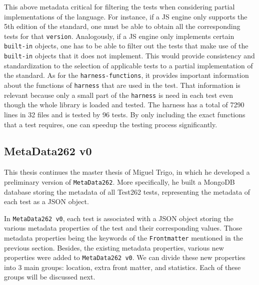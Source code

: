\documentclass[runningheads]{llncs}
\begin{document}
This above metadata critical for filtering the tests when considering partial implementations of the language. For instance, if a JS engine only supports the 5th edition of the standard, one must be able to obtain all the corresponding tests for that \texttt{version}. Analogously, if a JS engine only implements certain \texttt{built-in} objects, one has to be able to filter out the tests that make use of the \texttt{built-in} objects that it does not implement. This would provide consistency and standardization to the selection of applicable tests to a partial implementation of the standard.
%
As for the \texttt{harness-functions}, it provides important information about the functions of \texttt{harness} that are used in the test. That information is relevant because only a small part of the \texttt{harness} is need in each test even though the whole library is loaded and tested. The harness has a total of 7290 lines in 32 files and is tested by 96 tests. By only including the exact functions that a test requires, one can speedup the testing process significantly.



\subsection{MetaData262 v0}
\label{subsec:MetaData262 v0}



This thesis continues the master thesis of Miguel Trigo\cite{Thesis_Miguel_Trigo}, in which he developed a preliminary version of \texttt{MetaData262}. More specifically, he built a MongoDB database storing the metadata of all Test262 tests, representing the metadata of each test as a JSON object.



In \texttt{MetaData262 v0}, each test is associated with a JSON object storing the various metadata properties of the test and their corresponding values. Those metadata properties being the keywords of the \texttt{Frontmatter} mentioned in the previous section.
%
Besides, the existing metadata properties, various new properties were added to \texttt{MetaData262 v0}. We can divide these new properties into 3 main groups: location, extra front matter, and statistics. Each of these groups will be discussed next.
\end{document}
